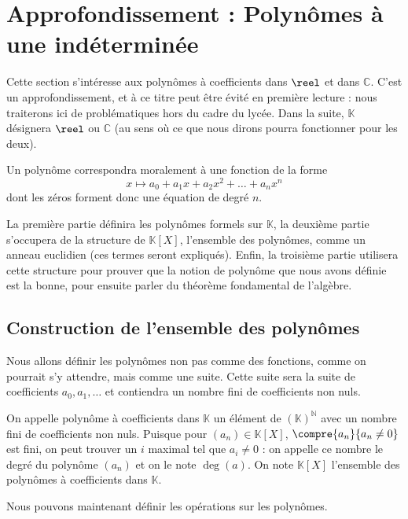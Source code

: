 \section{Approfondissement : Polynômes à une indéterminée}

Cette section s'intéresse aux polynômes à coefficients dans $\reel$ et dans $\mathbb C$. C'est un approfondissement, et à ce titre peut être évité en première lecture : nous traiterons ici de problématiques hors du cadre du lycée. Dans la suite, $\mathbb K$ désignera $\reel$ ou $\mathbb C$ (au sens où ce que nous dirons pourra fonctionner pour les deux).

Un polynôme correspondra moralement à une fonction de la forme $$x \mapsto a_0 + a_1x+a_2x^2+\ldots+a_n x^n$$ dont les zéros forment donc une équation de degré $n$.

La première partie définira les polynômes formels sur $\mathbb K$, la deuxième partie s'occupera de la structure de $\mathbb K [X]$, l'ensemble des polynômes, comme un anneau euclidien (ces termes seront expliqués). Enfin, la troisième partie utilisera cette structure pour prouver que la notion de polynôme que nous avons définie est la bonne, pour ensuite parler du théorème fondamental de l'algèbre.

\subsection{Construction de l'ensemble des polynômes}

Nous allons définir les polynômes non pas comme des fonctions, comme on pourrait s'y attendre, mais comme une suite. Cette suite sera la suite de coefficients $a_0,a_1,\ldots$ et contiendra un nombre fini de coefficients non nuls.

\begin{defi}
    On appelle polynôme à coefficients dans $\mathbb K$ un élément de $(\mathbb K)^\mathbb N$ avec un nombre fini de coefficients non nuls. Puisque pour $(a_n)\in\mathbb K[X]$, $\compre{a_n}{a_n\neq 0}$ est fini, on peut trouver un $i$ maximal tel que $a_i\neq 0$ : on appelle ce nombre le degré du polynôme $(a_n)$ et on le note $\deg(a)$. On note $\mathbb K[X]$ l'ensemble des polynômes à coefficients dans $\mathbb K$.
\end{defi}

Nous pouvons maintenant définir les opérations sur les polynômes.

